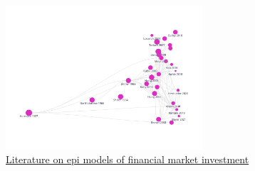 \begin{figure}[!ht] \centering  %
	\caption{\href{https://app.litmaps.co/shared/E25276CA-8725-437B-8241-11961EFB3FB4?wsid=1C4BD4E0-1E3C-4DBA-BAFD-5C50824CFC24}{Literature on epi models of financial market investment}}
	\label{fig:graph_investment}
	\centerline{\includegraphics[width=0.65\textwidth]{./figures/graph_investment}}
\end{figure}
